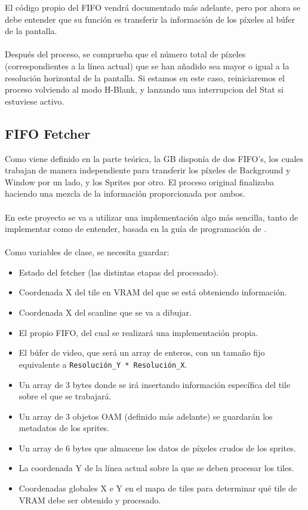 El código propio del FIFO vendrá documentado más adelante, pero por ahora se debe entender que su función es transferir la información de los píxeles al búfer de la pantalla. 
\\\\
Después del proceso, se comprueba que el número total de píxeles (correspondientes a la línea actual) que se han añadido sea mayor o igual a la resolución horizontal de la pantalla. Si estamos en este caso, reiniciaremos el proceso volviendo al modo H-Blank, y lanzando una interrupcion del Stat si estuviese activo.

\subsection{FIFO Fetcher}

Como viene definido en la parte teórica, la GB disponía de dos FIFO's, los cuales trabajan de manera independiente para transferir los píxeles de Background y Window por un lado, y los Sprites por otro. El proceso original finalizaba haciendo una mezcla de la información proporcionada por ambos.
\\\\
En este proyecto se va a utilizar una implementación algo más sencilla, tanto de implementar como de entender, basada en la guía de programación de \cite{lld}.
\\\\
Como variables de clase, se necesita guardar:

\begin{itemize} 
    \item Estado del fetcher (las distintas etapas del procesado).
    \item Coordenada X del tile en VRAM del que se está obteniendo información.
    \item Coordenada X del scanline que se va a dibujar.
    \item El propio FIFO, del cual se realizará una implementación propia.
    \item El búfer de video, que será un array de enteros, con un tamaño fijo equivalente a \texttt{Resolución\_Y * Resolución\_X}.
    \item Un array de 3 bytes donde se irá insertando información específica del tile sobre el que se trabajará.
    \item Un array de 3 objetos OAM (definido más adelante) se guardarán los metadatos de los sprites.
    \item Un array de 6 bytes que almacene los datos de píxeles crudos de los sprites.
    \item La coordenada Y de la línea actual sobre la que se deben procesar los tiles.
    \item Coordenadas globales X e Y en el mapa de tiles para determinar qué tile de VRAM debe ser obtenido y procesado.
\end{itemize}

